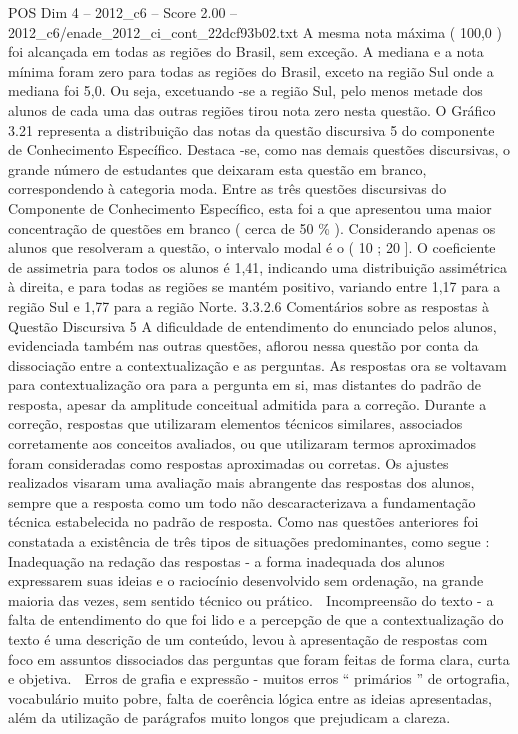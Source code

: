 \begin{textsample}{POS Dim 4 – 2012\_c6 – Score 2.00 – 2012\_c6/enade\_2012\_ci\_cont\_22dcf93b02.txt}
A mesma nota máxima ( 100,0 ) foi alcançada em todas as regiões do Brasil, sem exceção.
A mediana e a nota mínima foram zero para todas as regiões do Brasil, exceto na região Sul onde a mediana foi 5,0.
Ou seja, excetuando -se a região Sul, pelo menos metade dos alunos de cada uma das outras regiões tirou nota zero nesta questão.
O Gráfico 3.21 representa a distribuição das notas da questão discursiva 5 do componente de Conhecimento Específico.
Destaca -se, como nas demais questões discursivas, o grande número de estudantes que deixaram esta questão em branco, correspondendo à categoria moda.
Entre as três questões discursivas do Componente de Conhecimento Específico, esta foi a que apresentou uma maior concentração de questões em branco ( cerca de 50 \% ).
Considerando apenas os alunos que resolveram a questão, o intervalo modal é o ( 10 ; 20 ].
O coeficiente de assimetria para todos os alunos é 1,41, indicando uma distribuição assimétrica à direita, e para todas as regiões se mantém positivo, variando entre 1,17 para a região Sul e 1,77 para a região Norte. 3.3.2.6 Comentários sobre as respostas à Questão Discursiva 5 A dificuldade de entendimento do enunciado pelos alunos, evidenciada também nas outras questões, aflorou nessa questão por conta da dissociação entre a contextualização e as perguntas.
As respostas ora se voltavam para contextualização ora para a pergunta em si, mas distantes do padrão de resposta, apesar da amplitude conceitual admitida para a correção.
Durante a correção, respostas que utilizaram elementos técnicos similares, associados corretamente aos conceitos avaliados, ou que utilizaram termos aproximados foram consideradas como respostas aproximadas ou corretas.
Os ajustes realizados visaram uma avaliação mais abrangente das respostas dos alunos, sempre que a resposta como um todo não descaracterizava a fundamentação técnica estabelecida no padrão de resposta.
Como nas questões anteriores foi constatada a existência de três tipos de situações predominantes, como segue :  Inadequação na redação das respostas - a forma inadequada dos alunos expressarem suas ideias e o raciocínio desenvolvido sem ordenação, na grande maioria das vezes, sem sentido técnico ou prático.  Incompreensão do texto - a falta de entendimento do que foi lido e a percepção de que a contextualização do texto é uma descrição de um conteúdo, levou à apresentação de respostas com foco em assuntos dissociados das perguntas que foram feitas de forma clara, curta e objetiva.  Erros de grafia e expressão - muitos erros “ primários ” de ortografia, vocabulário muito pobre, falta de coerência lógica entre as ideias apresentadas, além da utilização de parágrafos muito longos que prejudicam a clareza.

\end{textsample}
